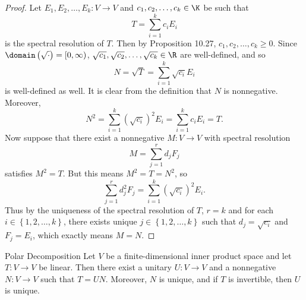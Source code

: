 \documentclass[linearalgebra]{subfiles}
\begin{document}
    \begin{proof}
        Let $E_1,E_2,\ldots,E_k:V\to V$ and $c_1,c_2,\ldots,c_k\in\K$ be such that
        \begin{equation*}
            T = \sum^{k}_{i=1} c_iE_i
        \end{equation*}
        is the spectral resolution of $T$. Then by Proposition 10.27, $c_1,c_2,\ldots,c_k\geq 0$. Since $\domain\left( \sqrt{\cdot} \right) = [0,\infty)$, $\sqrt{c_1}, \sqrt{c_2}, \ldots, \sqrt{c_k}\in\R$ are well-defined, and so
        \begin{equation*}
            N = \sqrt{T} = \sum^{k}_{i=1} \sqrt{c_i}E_i
        \end{equation*}
        is well-defined as well. It is clear from the definition that $N$ is nonnegative. Moreover,
        \begin{equation*}
            N^2 = \sum^{k}_{i=1} \left( \sqrt{c_i} \right) ^2E_i = \sum^{k}_{i=1} c_iE_i = T.
        \end{equation*}
        Now suppose that there exist a nonnegative $M:V\to V$ with spectral resolution
        \begin{equation*}
            M = \sum^{r}_{j=1} d_jF_j
        \end{equation*}
        satisfies $M^2=T$. But this means $M^2 = T = N^2$, so
        \begin{equation*}
            \sum^{r}_{j=1} d_j^2F_j = \sum^{k}_{i=1} \left( \sqrt{c_i} \right) ^2E_i.
        \end{equation*}
        Thus by the uniqueness of the spectral resolution of $T$, $r=k$ and for each $i\in\left\lbrace 1,2,\ldots,k \right\rbrace$, there exists unique $j\in\left\lbrace 1,2,\ldots,k \right\rbrace$ such that $d_j = \sqrt{c_i}$ and $F_j = E_i$, which exactly means $M=N$.
    \end{proof}

    \begin{theorem}{Polar Decomposition}
        Let $V$ be a finite-dimensional inner product space and let $T:V\to V$ be linear. Then there exist a unitary $U:V\to V$ and a nonnegative $N:V\to V$ such that $T = UN$. Moreover, $N$ is unique, and if $T$ is invertible, then $U$ is unique.
    \end{theorem}
\end{document}
